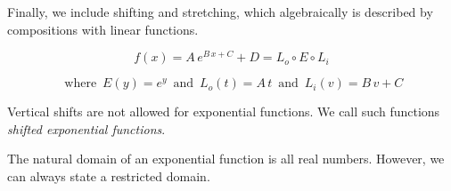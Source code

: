 \documentclass{ximera}
\begin{document}
\begin{template}
Finally, we include shifting and stretching, which algebraically is described by compositions with linear functions.


\[ f(x) = A \, e^{B \, x + C} + D = L_o \circ E \circ L_i\]

\[
\text{ where } \,  E(y) = e^y   \,  \text{ and } \,   L_o(t) = A \, t     \,  \text{ and } \,   L_i(v) = B \, v + C
\]



Vertical shifts are not allowed for exponential functions.  We call such functions \textit{shifted exponential functions}.  






\end{template}





The natural domain of an exponential function is all real numbers.  However, we can always state a restricted domain. 
\end{document}
